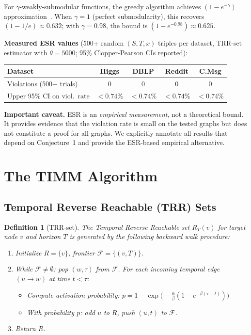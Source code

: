 \documentclass[10pt,conference]{IEEEtran}
\newtheorem{definition}{Definition}
\begin{document}
For $\gamma$-weakly-submodular functions, the greedy algorithm achieves $(1-e^{-\gamma})$ approximation~\cite{nemhauser1978}.
When $\gamma = 1$ (perfect submodularity), this recovers $(1-1/e) \approx 0.632$; with $\gamma = 0.98$, the bound is $(1-e^{-0.98}) \approx 0.625$.

\textbf{Measured ESR values} (500+ random $(S,T,x)$ triples per dataset, TRR-set estimator with $\theta=5000$; 95\% Clopper-Pearson CIs reported):
\begin{center}
\footnotesize
\setlength{\tabcolsep}{5pt}
\begin{tabular}{@{}lcccc@{}}
\toprule
Dataset & Higgs & DBLP & Reddit & C.Msg \\
\midrule
Violations (500+ trials) & 0 & 0 & 0 & 0 \\
Upper 95\% CI on viol.\ rate & ${<}0.74\%$ & ${<}0.74\%$ & ${<}0.74\%$ & ${<}0.74\%$ \\
\bottomrule
\end{tabular}
\end{center}

\textbf{Important caveat.}
ESR is an \emph{empirical measurement}, not a theoretical bound.
It provides evidence that the violation rate is small on the tested graphs but does not constitute a proof for all graphs.
We explicitly annotate all results that depend on Conjecture~1 and provide the ESR-based empirical alternative.

\section{The TIMM Algorithm}

\subsection{Temporal Reverse Reachable (TRR) Sets}

\begin{definition}[TRR-set]
\label{def:trr}
The Temporal Reverse Reachable set $R_T(v)$ for target node $v$ and horizon $T$ is generated by the following backward walk procedure:
\begin{enumerate}
\item Initialize $R = \{v\}$, frontier $\mathcal{F} = \{(v, T)\}$.
\item While $\mathcal{F} \neq \emptyset$: pop $(w, \tau)$ from $\mathcal{F}$.
For each incoming temporal edge $(u \rightarrow w)$ at time $t < \tau$:
\begin{itemize}
\item Compute activation probability:
$p = 1 - \exp\!\big(-\frac{\alpha}{\beta}(1 - e^{-\beta(\tau - t)})\big)$
\item With probability $p$: add $u$ to $R$, push $(u, t)$ to $\mathcal{F}$.
\end{itemize}
\item Return $R$.
\end{enumerate}
\end{definition}
\end{document}
